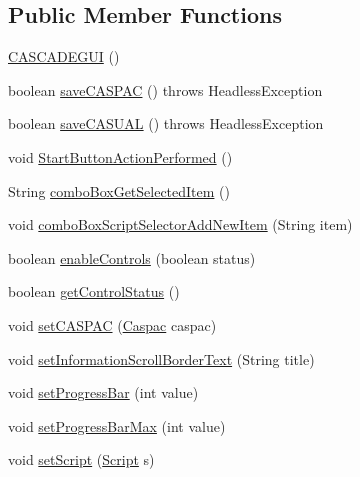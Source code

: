 \subsection*{Public Member Functions}
\begin{DoxyCompactItemize}
\item 
\hyperlink{classCASCADEGUI_1_1CASCADEGUI_a0b88ad9efe93a90a98d952994d90e48d}{C\-A\-S\-C\-A\-D\-E\-G\-U\-I} ()
\item 
boolean \hyperlink{classCASCADEGUI_1_1CASCADEGUI_a51bf4e148a88136f75b5d780993aebaf}{save\-C\-A\-S\-P\-A\-C} ()  throws Headless\-Exception 
\item 
boolean \hyperlink{classCASCADEGUI_1_1CASCADEGUI_ae85d06f07046a2594867d4dce9eae47b}{save\-C\-A\-S\-U\-A\-L} ()  throws Headless\-Exception 
\item 
void \hyperlink{classCASCADEGUI_1_1CASCADEGUI_a0b56a081d828cd896d81278086a55871}{Start\-Button\-Action\-Performed} ()
\item 
String \hyperlink{classCASCADEGUI_1_1CASCADEGUI_af25dc89641d2fda0b73830594ba30b2d}{combo\-Box\-Get\-Selected\-Item} ()
\item 
void \hyperlink{classCASCADEGUI_1_1CASCADEGUI_a1813e3b344e699edfa6ff6fb732fd602}{combo\-Box\-Script\-Selector\-Add\-New\-Item} (String item)
\item 
boolean \hyperlink{classCASCADEGUI_1_1CASCADEGUI_ac4c6bac7bbe7bdfdd74aba69571e2ee0}{enable\-Controls} (boolean status)
\item 
boolean \hyperlink{classCASCADEGUI_1_1CASCADEGUI_a4a473942292f9a51f057d128b62910d6}{get\-Control\-Status} ()
\item 
void \hyperlink{classCASCADEGUI_1_1CASCADEGUI_aac14a58f86200f7e55e2223db8a7b5d8}{set\-C\-A\-S\-P\-A\-C} (\hyperlink{classCASUAL_1_1caspac_1_1Caspac}{Caspac} caspac)
\item 
void \hyperlink{classCASCADEGUI_1_1CASCADEGUI_a105553c3bb3dbadac14672993160cb1e}{set\-Information\-Scroll\-Border\-Text} (String title)
\item 
void \hyperlink{classCASCADEGUI_1_1CASCADEGUI_adb2973646bf59367a782ad933bc86c60}{set\-Progress\-Bar} (int value)
\item 
void \hyperlink{classCASCADEGUI_1_1CASCADEGUI_a2c09183b7f524fda208305ad72ac05ef}{set\-Progress\-Bar\-Max} (int value)
\item 
void \hyperlink{classCASCADEGUI_1_1CASCADEGUI_a6b753ecf736bbae2c6781c927f997eb4}{set\-Script} (\hyperlink{classCASUAL_1_1caspac_1_1Script}{Script} s)
\item 

\end{DoxyCompactItemize}
